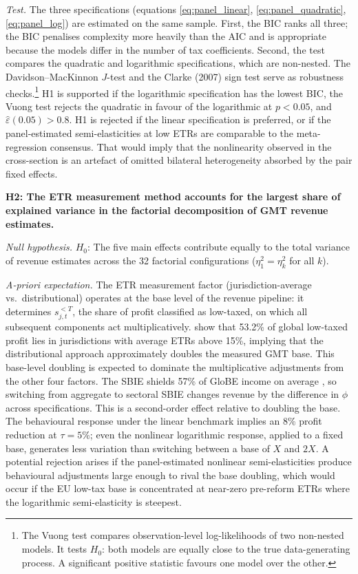 \documentclass[11pt,a4paper]{article}
\begin{document}
\textit{Test.} The three specifications (equations \ref{eq:panel_linear}, \ref{eq:panel_quadratic}, \ref{eq:panel_log}) are estimated on the same sample. First, the BIC ranks all three; the BIC penalises complexity more heavily than the AIC and is appropriate because the models differ in the number of tax coefficients. Second, the \citet{vuong1989} test compares the quadratic and logarithmic specifications, which are non-nested. The Davidson--MacKinnon $J$-test and the Clarke (2007) sign test serve as robustness checks.\footnote{The Vuong test compares observation-level log-likelihoods of two non-nested models. It tests $H_0$: both models are equally close to the true data-generating process. A significant positive statistic favours one model over the other.} H1 is supported if the logarithmic specification has the lowest BIC, the Vuong test rejects the quadratic in favour of the logarithmic at $p < 0.05$, and $\hat{\varepsilon}(0.05) > 0.8$. H1 is rejected if the linear specification is preferred, or if the panel-estimated semi-elasticities at low ETRs are comparable to the meta-regression consensus. That would imply that the nonlinearity observed in the cross-section is an artefact of omitted bilateral heterogeneity absorbed by the pair fixed effects.

\textbf{H2: The ETR measurement method accounts for the largest share of explained variance in the factorial decomposition of GMT revenue estimates.}

\textit{Null hypothesis.} $H_0$: The five main effects contribute equally to the total variance of revenue estimates across the 32 factorial configurations ($\eta_1^2 = \eta_k^2$ for all $k$).

\textit{A-priori expectation.} The ETR measurement factor (jurisdiction-average vs.\ distributional) operates at the base level of the revenue pipeline: it determines $s_{j,t}^{<T}$, the share of profit classified as low-taxed, on which all subsequent components act multiplicatively. \citet{hugger2026} show that 53.2\% of global low-taxed profit lies in jurisdictions with average ETRs above 15\%, implying that the distributional approach approximately doubles the measured GMT base. This base-level doubling is expected to dominate the multiplicative adjustments from the other four factors. The SBIE shields 57\% of GloBE income on average \citep{devereux2023}, so switching from aggregate to sectoral SBIE changes revenue by the difference in $\phi$ across specifications. This is a second-order effect relative to doubling the base. The behavioural response under the linear benchmark implies an 8\% profit reduction at $\tau = 5\%$; even the nonlinear logarithmic response, applied to a fixed base, generates less variation than switching between a base of $X$ and $2X$. A potential rejection arises if the panel-estimated nonlinear semi-elasticities produce behavioural adjustments large enough to rival the base doubling, which would occur if the EU low-tax base is concentrated at near-zero pre-reform ETRs where the logarithmic semi-elasticity is steepest.
\end{document}
